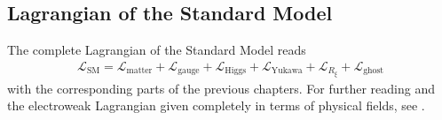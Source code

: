 \subsection{Lagrangian of the Standard Model}
The complete Lagrangian of the Standard Model reads
\begin{align}
\mathcal{L}_{\mathrm{SM}} = \mathcal{L}_{\mathrm{matter}} + \mathcal{L}_{\mathrm{gauge}} + \mathcal{L}_{\mathrm{Higgs}} + \mathcal{L}_{\mathrm{Yukawa}} + \mathcal{L}_{R_\xi} + \mathcal{L}_{\mathrm{ghost}}
\end{align}
with the corresponding parts of the previous chapters. For further reading and the electroweak Lagrangian given completely in terms of physical fields, see \cite{book:811554}.
